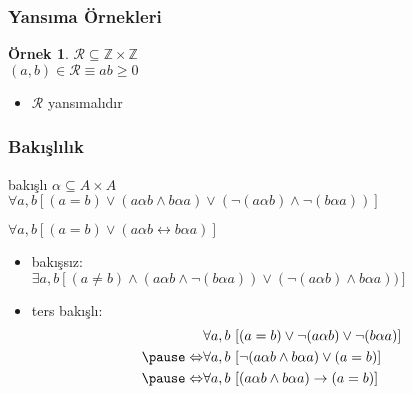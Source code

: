 \documentclass[dvipsnames]{beamer}
\theoremstyle{definition}
\theoremstyle{example}
\newtheorem{ornek}[theorem]{Örnek}
\theoremstyle{plain}
\begin{document}
\begin{frame}
  \frametitle{Yansıma Örnekleri}

  \begin{ornek}
    $\mathcal{R} \subseteq \mathbb{Z} \times \mathbb{Z}$\\
    $(a,b) \in \mathcal{R} \equiv ab \geq 0$

    \medskip
    \begin{itemize}
      \item $\mathcal{R}$ yansımalıdır
    \end{itemize}
  \end{ornek}
\end{frame}

\begin{frame}
  \frametitle{Bakışlılık}

  \begin{block}{bakışlı}
    $\alpha \subseteq A \times A$\\
    $\forall a,b [(a=b) \vee (a \alpha b \wedge b \alpha a)
                        \vee (\neg(a \alpha b) \wedge \neg(b \alpha a))]$

    \pause
    \medskip
    $\forall a,b [(a=b) \vee (a \alpha b \leftrightarrow b \alpha a)]$
  \end{block}

  \pause
  \begin{itemize}

    \item bakışsız:\\
      $\exists a,b [(a \neq b) \wedge (a \alpha b \wedge \neg(b \alpha a))
                               \vee (\neg (a \alpha b) \wedge b \alpha a))]$

    \pause
    \item ters bakışlı:
    \begin{eqnarray*}
                      & \forall a,b~
                    [(a=b) \vee \neg(a \alpha b) \vee \neg(b \alpha a)]\\\pause
      \Leftrightarrow & \forall a,b~
                    [\neg(a \alpha b \wedge b \alpha a) \vee (a=b)]\\\pause
      \Leftrightarrow & \forall a,b~
                    [(a \alpha b \wedge b \alpha a) \rightarrow (a=b)]
    \end{eqnarray*}
  \end{itemize}
\end{frame}
\end{document}
